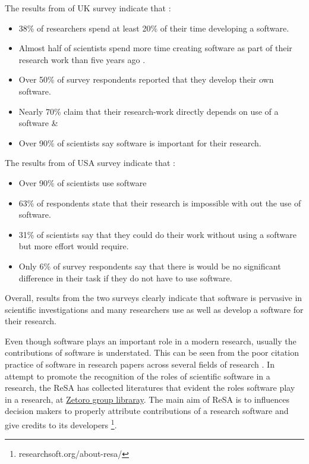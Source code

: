 The results from of \ac{UK} survey indicate that \citep{hettrick2014uk}:
\begin{itemize}%
	\item 38\% of researchers spend at least 20\% of their time developing a software.
	\item Almost half of scientists spend more time creating software as part of their research work than five years ago .
	\item Over 50\% of survey respondents reported that they develop their own software. 
	\item Nearly 70\% claim that their research-work directly depends on use of a software \&
	\item Over 90\% of scientists say software is important for their research. 
\end{itemize}

The results from of \ac{USA} survey indicate that \citep{nangia2017track}:
\begin{itemize}%
	\item Over 90\% of scientists use software 
	\item 63\% of respondents state that their research is impossible with out the use of software.
	\item 31\% of scientists say that they could do their work without using a software but more effort would require.
	\item Only 6\% of survey respondents say that there is would be no significant difference in their task if they do not have to use software. 
	
\end{itemize}

Overall, results from the two surveys clearly indicate that software is pervasive in scientific investigations and many researchers use as well as develop a software for their research.

Even though software plays an important role in a modern research, usually the contributions of software is understated. This can be seen from the poor citation practice of software in research papers across several fields of research \cite{yang2018important, pan2016disciplinary}.  In attempt to promote the recognition of the roles of scientific software in a research, the \ac{ReSA} has collected literatures that evident the roles software play in a research, at \href{https://www.zotero.org/groups/2400609/resa/library}{Zetoro group libraray}. The main aim of \ac{ReSA} is to influences decision makers to properly attribute contributions of a research software and give credits to its developers \footnote{researchsoft.org/about-resa/}.

